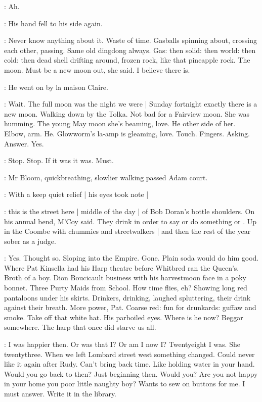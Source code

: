 \BloomInt:
Ah.

:
His hand fell to his side again.

\BloomInt:
Never know anything about it.
Waste of time.
Gasballs spinning about,
crossing each other,
passing.
Same old dingdong always.
Gas:
then solid:
then world:
then cold:
then dead shell drifting around,
frozen rock,
like that pineapple rock.
The moon.
Must be a new moon out,
she said.
I believe there is.

:
He went on by la maison Claire.

\BloomInt:
Wait.
The full moon was the night we were |
Sunday fortnight exactly there is a new moon.
Walking down by the Tolka.
Not bad for a Fairview moon.
She was humming.
The young May moon she's beaming,
love.
He other side of her.
Elbow, arm.
He.
Glowworm's la-amp is gleaming, love.
Touch.
Fingers.
Asking.
Answer.
Yes.

\BloomInt:
Stop.
Stop.
If it was it was.
Must.

:
Mr Bloom, quickbreathing,
slowlier walking passed Adam court.

:
With a keep quiet relief |
his eyes took note |

\BloomInt:
this is the street here |
middle of the day |
of Bob Doran's bottle shoulders.
On his annual bend,
M'Coy said.
They drink in order to say or do something or
.
Up in the Coombe with chummies and streetwalkers |
and then the rest of the year sober as a judge.

\BloomInt:
Yes.
Thought so.
Sloping into the Empire.
Gone.
Plain soda would do him good.
Where Pat Kinsella had his Harp theatre
before Whitbred ran the Queen's.
Broth of a boy.
Dion Boucicault business with his harvestmoon face in a poky bonnet.
Three Purty Maids from School.
How time flies, eh?
Showing long red pantaloons under his skirts.
Drinkers, drinking, laughed spluttering,
their drink against their breath.
More power, Pat.
Coarse red:
fun for drunkards:
guffaw and smoke.
Take off that white hat.
His parboiled eyes.
Where is he now?
Beggar somewhere.
The harp that once did starve us all.

\BloomInt:
I was happier then.
Or was that I?
Or am I now I?
Twentyeight I was.
She twentythree.
When we left Lombard street west something changed.
Could never like it again after Rudy.
Can't bring back time.
Like holding water in your hand.
Would you go back to then?
Just beginning then.
Would you?
Are you not happy in your home you poor little naughty boy?
Wants to sew on buttons for me.
I must answer.
Write it in the library.

